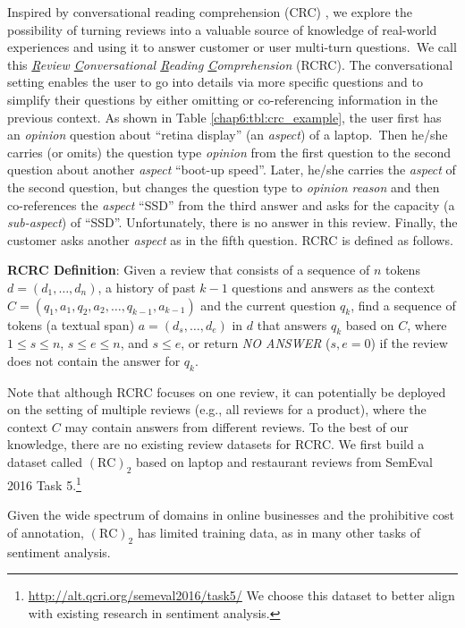     
Inspired by conversational reading comprehension (CRC) \cite{reddy2018coqa,choi2018quac,xu-etal-2019-bert}, we explore the possibility of turning reviews into a valuable source of knowledge of real-world experiences and using it to answer customer or user multi-turn questions.~We call this \textit{\underline{R}eview \underline{C}onversational \underline{R}eading \underline{C}omprehension} (RCRC).
The conversational setting enables the user to go into details via more specific questions and to simplify their questions by either omitting or co-referencing information in the previous context.
As shown in Table \ref{chap6:tbl:crc_example}, 
the user first has an \textit{opinion} question about ``retina display'' (an \textit{aspect}) of a laptop.~Then he/she carries (or omits) the question type \textit{opinion} from the first question to the second question about another \textit{aspect} ``boot-up speed''.
Later, he/she carries the \textit{aspect} of the second question, but changes the question type to \textit{opinion reason} and then co-references the \textit{aspect} ``SSD'' from the third answer and asks for the capacity (a \textit{sub-aspect}) of ``SSD''.
Unfortunately, there is no answer in this review. 
Finally, the customer asks another \textit{aspect} as in the fifth question. RCRC is defined as follows.

\noindent\textbf{RCRC Definition}: Given a review that consists of a sequence of $n$ tokens $d=(d_1, \dots, d_n)$, a history of past $k-1$ questions and answers as the context $C=(q_1, a_1, q_2, a_2, \dots, q_{k-1}, a_{k-1})$ and the current question $q_k$, find a sequence of tokens (a textual span) $a=(d_s, \dots, d_e)$ in $d$ that answers $q_k$ based on $C$, where $1 \le s \le n$, $s\le e \le n$, and $s\le e$, or return \textit{NO ANSWER} ($s, e=0$) if the review does not contain the answer for $q_k$.

Note that although RCRC focuses on one review, it can potentially be deployed on the setting of multiple reviews (e.g., all reviews for a product), where the context $C$ may contain answers from different reviews.
To the best of our knowledge, there are no existing review datasets for RCRC. We first build a dataset called $(\text{RC})_2$ based on laptop and restaurant reviews from SemEval 2016 Task 5.\footnote{\url{http://alt.qcri.org/semeval2016/task5/} We choose this dataset to better align with existing research in sentiment analysis.} 

Given the wide spectrum of domains in online businesses and the prohibitive cost of annotation, $(\text{RC})_2$ has limited training data,
as in many other tasks of sentiment analysis.

